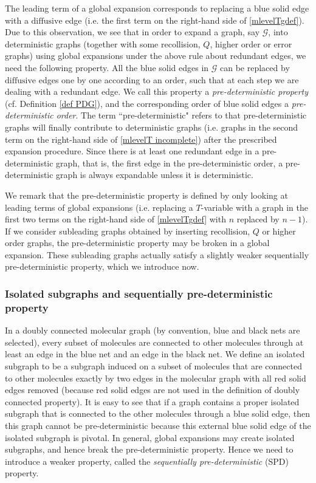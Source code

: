 \documentclass{article}
\newcommand{\1}{\mathds{1}}
\numberwithin{equation}{section}
\renewcommand{\cal}{\mathcal}
\newcommand{\dashed}{\text{diffusive}}
\theoremstyle{plain} %
\theoremstyle{remark}
\newcommand{\cor}{\color{red}}
\newcommand{\hty}[1]{{\cor (ht: #1) }}
\begin{document}
The leading term of a global expansion corresponds to replacing a blue solid edge with a $\dashed$ edge (i.e. the first term on the right-hand side of \eqref{mlevelTgdef}). Due to this observation, we see that in order to expand a graph, say $\cal G$, into deterministic graphs (together with some recollision, $Q$, higher order or error graphs) using global expansions under the above rule about redundant edges, we need the following property. All the blue solid edges in $\cal G$ can be replaced by $\dashed$ edges one by one according to an order, such that at each step we are dealing with a redundant edge. We call this property a \emph{pre-deterministic property}  (cf. Definition \ref{def PDG}), and the corresponding order of blue solid edges a \emph{pre-deterministic order}. The term ``pre-deterministic" refers to that pre-deterministic graphs will finally contribute to deterministic graphs (i.e. graphs in the second term on the right-hand side of \eqref{mlevelT incomplete}) after the prescribed expansion procedure. Since there is at least one redundant edge in a pre-deterministic graph, that is, the first edge in the pre-deterministic order, a pre-deterministic graph is always expandable unless it is deterministic.  

We remark that the pre-deterministic property is defined by only looking at leading terms of global expansions (i.e. replacing a $T$-variable with a graph in the first two terms on the right-hand side of \eqref{mlevelTgdef} with $n$ replaced by $n-1$). %
If we consider subleading graphs obtained by inserting recollision, $Q$ or higher order graphs, the pre-deterministic property may be broken in a global expansion. These subleading graphs actually satisfy a slightly weaker sequentially pre-deterministic property, which we introduce now.

\subsubsection{Isolated subgraphs and sequentially pre-deterministic property}



In a doubly connected molecular graph (by convention, blue and black nets are selected), every subset of molecules are connected to other molecules through at least an edge in the blue net and an edge in the black net. We define an isolated subgraph to be a subgraph induced on a subset of molecules that are connected to other molecules exactly by two edges in the molecular graph with all red solid edges removed (because red solid edges are not used in the definition of doubly connected property). It is easy to see that if a graph contains a proper  isolated subgraph that is connected to the other molecules through a blue solid edge, then this graph cannot be pre-deterministic
 because this external blue solid edge of the isolated subgraph is pivotal. In general, global expansions may create isolated subgraphs, and hence break the pre-deterministic property. Hence we need to introduce a weaker property, called the \emph{sequentially pre-deterministic} (SPD) property. 
\end{document}

